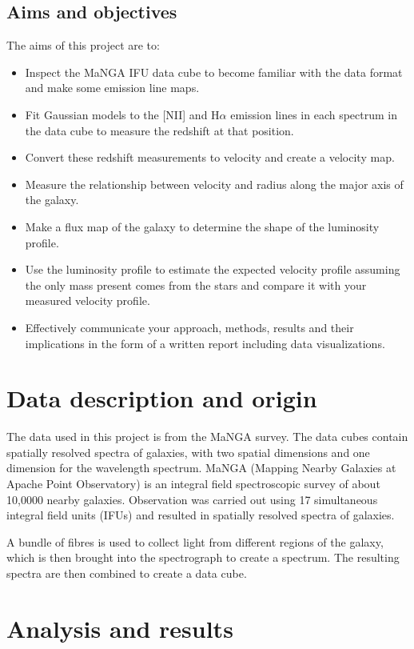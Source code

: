 \documentclass{article}
\begin{document}
\subsection{Aims and objectives}
The aims of this project are to:
\begin{itemize}
    \item Inspect the MaNGA IFU data cube to become familiar with the data format and make some
emission line maps.
    \item Fit Gaussian models to the [NII] and H$\alpha$ emission lines in each spectrum in the data cube to
measure the redshift at that position.
    \item Convert these redshift measurements to velocity and create a velocity map.
    \item Measure the relationship between velocity and radius along the major axis of the galaxy.
    \item Make a flux map of the galaxy to determine the shape of the luminosity profile.
    \item Use the luminosity profile to estimate the expected velocity profile assuming the only mass present
comes from the stars and compare it with your measured velocity profile.
    \item Effectively communicate your approach, methods, results and their implications in the form of a
written report including data visualizations.
\end{itemize}


\section{Data description and origin}
The data used in this project is from the MaNGA survey. The data cubes contain spatially resolved spectra of
galaxies, with two spatial dimensions and one dimension for the wavelength spectrum. MaNGA (Mapping Nearby Galaxies 
at Apache Point Observatory) is an integral field spectroscopic survey of about 10,0000 nearby galaxies. Observation 
was carried out using 17 simultaneous integral field units (IFUs) and resulted in spatially resolved spectra of 
galaxies. 

A bundle of fibres is used to collect light from different regions of the galaxy, which is then brought into the
spectrograph to create a spectrum. The resulting spectra are then combined to create a data cube.

\section{Analysis and results}
\end{document}
